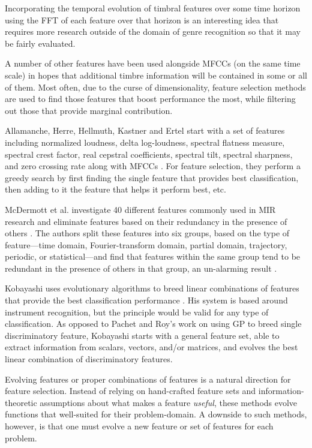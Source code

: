 \documentclass[a4paper,12pt]{report} 	%
\numberwithin{figure}{chapter}
\numberwithin{table}{chapter}
\numberwithin{equation}{chapter}
\begin{document}
\begin{flushleft}
Incorporating the temporal evolution of timbral features over some time horizon using the FFT of each feature over that horizon is an interesting idea that requires more research outside of the domain of genre recognition so that it may be fairly evaluated.

A number of other features have been used alongside MFCCs (on the same time scale) in hopes that additional timbre information will be contained in some or all of them. Most often, due to the curse of dimensionality, feature selection methods are used to find those features that boost performance the most, while filtering out those that provide marginal contribution. 

Allamanche, Herre, Hellmuth, Kastner and Ertel start with a set of features including normalized loudness, delta log-loudness, spectral flatness measure, spectral crest factor, real cepstral coefficients, spectral tilt, spectral sharpness, and zero crossing rate along with MFCCs \cite{Allamanche:2002yo}. For feature selection, they perform a greedy search by first finding the single feature that provides best classification, then adding to it the feature that helps it perform best, etc.

McDermott et al. investigate 40 different features commonly used in MIR research and eliminate features based on their redundancy in the presence of others \cite[p. 1]{McDermott:2005xq}. The authors split these features into six groups, based on the type of feature---time domain, Fourier-transform domain, partial domain, trajectory, periodic, or statistical---and find that features within the same group tend to be redundant in the presence of others in that group, an un-alarming result \cite[p. 6]{McDermott:2005xq}.

Kobayashi uses evolutionary algorithms to breed linear combinations of features that provide the best classification performance \cite{Kobayashi:2009la}. His system is based around instrument recognition, but the principle would be valid for any type of classification. As opposed to Pachet and Roy's work \cite{Pachet:2007if} on using GP to breed single discriminatory feature, Kobayashi starts with a general feature set, able to extract information from scalars, vectors, and/or matrices, and evolves the best linear combination of discriminatory features.

Evolving features or proper combinations of features is a natural direction for feature selection. Instead of relying on hand-crafted feature sets and information-theoretic assumptions about what makes a feature \emph{useful}, these methods evolve functions that well-suited for their problem-domain. A downside to such methods, however, is that one must evolve a new feature or set of features for each problem.


\end{flushleft}
\end{document}
